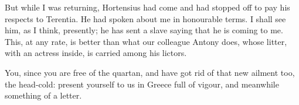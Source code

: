  But while I was returning, Hortensius had come and had stopped off to pay his respects to Terentia. He had spoken about me in honourable terms. I shall see him, as I think, presently; he has sent a slave saying that he is coming to me. This, at any rate, is better than what our colleague Antony does, whose litter, with an actress inside, is carried among his lictors.

 You, since you are free of the quartan, and have got rid of that new ailment too, the head-cold: present yourself to us in Greece full of vigour, and meanwhile something of a letter.
